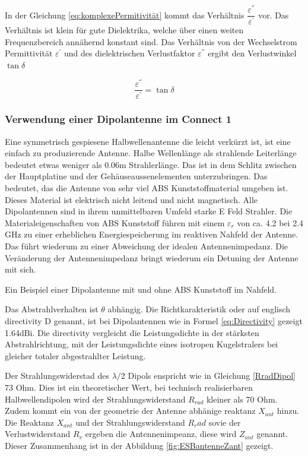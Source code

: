 In der Gleichung \ref{eq:komplexePermitivität} kommt das Verhältnis $\dfrac{\varepsilon^{''}}{\varepsilon^{'}}$ vor. Das Verhältnis ist klein für gute Dielektrika, welche über einen weiten Frequenzbereich annähernd konstant sind. Das Verhältnis von der Wechselstrom Permittivität $\varepsilon^{'}$ und des dielektrischen Verlustfaktor $\varepsilon^{''}$ ergibt den Verlustwinkel $\tan\delta$

\begin{equation} \label{eq:VerlustwinkelEpsilonPermitivität}
\dfrac{\varepsilon^{''}}{\varepsilon^{'}}=\tan\delta
\end{equation}


\subsubsection*{Verwendung einer Dipolantenne im Connect 1}
Eine symmetrisch gespiesene Halbwellenantenne die leicht verkürzt ist,  ist eine einfach zu produzierende Antenne. Halbe Wellenlänge als strahlende Leiterlänge bedeutet etwas weniger als 0.06m Strahlerlänge. Das ist in dem Schlitz zwischen der Hauptplatine und der Gehäuseaussenelementen unterzubringen. 
Das bedeutet, das die Antenne von sehr viel ABS Kunststoffmaterial umgeben ist. Dieses Material ist elektrisch nicht leitend und nicht magnetisch. Alle Dipolantennen sind in ihrem unmittelbaren Umfeld starke E Feld Strahler.  Die Materialeigenschaften von ABS Kunststoff führen mit einem  $\varepsilon_r$ von ca. 4.2 bei 2.4 GHz zu einer erheblichen Energiespeicherung im reaktiven Nahfeld der Antenne. Das führt wiederum zu einer Abweichung der idealen Antennenimpedanz. Die Veränderung der Antennenimpedanz bringt wiederum ein Detuning der Antenne mit sich.

Ein Beispiel einer Dipolantenne mit und ohne ABS Kunststoff im Nahfeld.

Das Abstrahlverhalten ist $\theta$ abhängig. Die Richtkarakteristik oder auf englisch directivity D genannt, ist bei Dipolantennen wie in Formel \ref{eq:Directivity} gezeigt 1.64dBi. Die directivity vergleicht die Leistungsdichte in der stärksten Abstrahlrichtung, mit der Leistungsdichte eines isotropen Kugelstralers bei gleicher totaler abgestrahlter Leistung. 

Der Strahlungswiderstad des $\lambda/2$ Dipols enspricht wie in Gleichung \ref{RradDipol} 73 Ohm. Dies ist ein theoretischer Wert, bei technisch realisierbaren Halbwellendipolen wird der Strahlungswiderstand $R_{rad}$ kleiner als 70 Ohm. Zudem kommt  ein von der  geometrie der Antenne abhänige reaktanz $X_{ant}$ hinzu.
Die Reaktanz $X_{ant}$ und der Strahlungswiderstand $R_rad$ sovie der Verlustwiderstand $R_v$ ergeben die Antennenimpeanz, diese wird $Z_{ant}$  genannt. Dieser Zusammenhang ist  in der Abbildung \ref{fig:ESBantenneZant} gezeigt.

